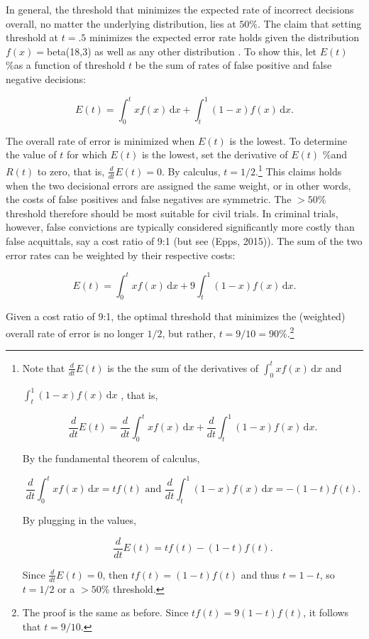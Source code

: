 \documentclass[10pt,dvipsnames,enabledeprecatedfontcommands]{scrartcl}
\begin{document}
In general, the threshold that minimizes the expected rate of incorrect
decisions overall, no matter the underlying distribution, lies at
\(50\%\). The claim that setting threshold at \(t=.5\) minimizes the
expected error rate holds given the distribution \(f(x)=\)beta(18,3) as
well as any other distribution
\citep{kaye1982limits, Kaye1999Clarifying-the-, cheng2015}. To show
this, let \(E(t)\) \%as a function of threshold \(t\) be the sum of
rates of false positive and false negative decisions:

\[E(t) = \int_0^t \! x f(x) \, \mathrm{d}x + \int_t^1 \! (1-x) f(x) \, \mathrm{d}x.
\]

The overall rate of error is minimized when \(E(t)\) is the lowest. To
determine the value of \(t\) for which \(E(t)\) is the lowest, set the
derivative of \(E(t)\) \%and \(R(t)\) to zero, that is,
\(\frac{d}{dt} E(t)= 0\). By calculus,
\(t=1/2\).\footnote{Note that $\frac{d}{dt}  E(t)$ is the the sum of the derivatives of $\int_0^t \! x f(x) \, \mathrm{d}x$ 
and 

$\int_t^1 \!(1-x) f(x) \, \mathrm{d}x$
, that is,

\[\frac{d}{dt} E(t) = \frac{d}{dt}  \int_0^t \! x f(x) \, \mathrm{d}x + \frac{d}{dt}  \int_t^1 \! (1-x) f(x) \, \mathrm{d}x.\]

By the fundamental theorem of calculus, 

\[\frac{d}{dt}   \int_0^t \! x f(x) \, \mathrm{d}x = tf(t) \text{ and }
\frac{d}{dt}   \int_t^1 \! (1-x) f(x) \, \mathrm{d}x = -(1-t)f(t). \]

By plugging in the values, 

\[\frac{d}{dt}  E(t) = tf(t)  -(1-t)f(t). \]

Since $\frac{d}{dt}  E(t)= 0$, then $tf(t)  = (1-t)f(t)$
and thus
$t  = 1-t$, so 
$t  = 1/2$ or a $>50\%$ threshold.
} This claims holds when the two decisional errors are assigned the same
weight, or in other words, the costs of false positives and false
negatives are symmetric. The \(>50\%\) threshold therefore should be
most suitable for civil trials. In criminal trials, however, false
convictions are typically considered significantly more costly than
false acquittals, say a cost ratio of 9:1 (but see (Epps, 2015)). The
sum of the two error rates can be weighted by their respective costs:

\[E(t) = \int_0^t \! x f(x) \, \mathrm{d}x + 9\int_t^1 \! (1-x) f(x) \, \mathrm{d}x.
\]

Given a cost ratio of 9:1, the optimal threshold that minimizes the
(weighted) overall rate of error is no longer \(1/2\), but rather,
\(t=9/10=90\%\).\footnote{The proof is the same as before. Since $tf(t)  = 9(1-t)f(t)$, it follows that 
$t  = 9/10$.}
\end{document}
